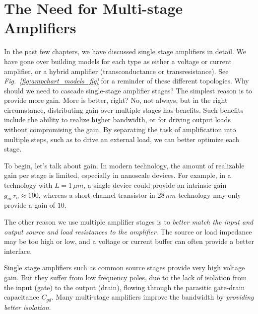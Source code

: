 \section{The Need for Multi-stage Amplifiers}
In the past few chapters, we have discussed single stage amplifiers in detail.  We have gone over building models for each type as either a voltage or current amplifier, or a hybrid amplifier (transconductance or transresistance).  See \emph{Fig.~\ref{fig:ampchart_models_fig}} for a reminder of these different topologies.  Why should we need to cascade single-stage amplifier stages?  The simplest reason is to provide more gain.   More is better, right? No, not always, but in the right circumstance, distributing gain over multiple stages has benefits. Such benefits include the ability to realize higher bandwidth, or for driving output loads without compromising the gain.  By separating the task of amplification into multiple steps, such as to drive an external load, we can better optimize each stage.

To begin, let's talk about gain.  In modern technology, the amount of realizable gain per stage is limited, especially in nanoscale devices.  For example, in a technology with $L = 1\,\mu m$, a single device could provide an intrinsic gain $g_m\,r_o \approx 100$, whereas a short channel transistor in $28\,nm$ technology may only provide a gain of $10$.  

The other reason we use multiple amplifier stages is to \textit{better match the input and output source and load resistances to the amplifier}.  The source or load impedance may be too high or low, and a voltage or current buffer can often provide a better interface.  

Single stage amplifiers such as common source stages provide very high voltage gain.  But they suffer from low frequency poles, due to the lack of isolation from the input (gate) to the output (drain), flowing through the parasitic gate-drain capacitance $C_{gd}$.  Many multi-stage amplifiers improve the bandwidth by \textit{providing better isolation}.  

